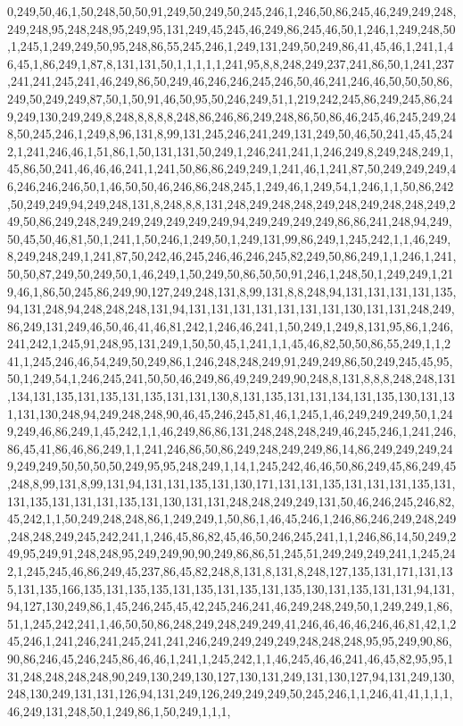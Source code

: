 0,249,50,46,1,50,248,50,50,91,249,50,249,50,245,246,1,246,50,86,245,46,249,249,248,249,248,95,248,248,95,249,95,131,249,45,245,46,249,86,245,46,50,1,246,1,249,248,50,1,245,1,249,249,50,95,248,86,55,245,246,1,249,131,249,50,249,86,41,45,46,1,241,1,46,45,1,86,249,1,87,8,131,131,50,1,1,1,1,1,241,95,8,8,248,249,237,241,86,50,1,241,237,241,241,245,241,46,249,86,50,249,46,246,246,245,246,50,46,241,246,46,50,50,50,86,249,50,249,249,87,50,1,50,91,46,50,95,50,246,249,51,1,219,242,245,86,249,245,86,249,249,130,249,249,8,248,8,8,8,8,248,86,246,86,249,248,86,50,86,46,245,46,245,249,248,50,245,246,1,249,8,96,131,8,99,131,245,246,241,249,131,249,50,46,50,241,45,45,242,1,241,246,46,1,51,86,1,50,131,131,50,249,1,246,241,241,1,246,249,8,249,248,249,1,45,86,50,241,46,46,46,241,1,241,50,86,86,249,249,1,241,46,1,241,87,50,249,249,249,46,246,246,246,50,1,46,50,50,46,246,86,248,245,1,249,46,1,249,54,1,246,1,1,50,86,242,50,249,249,94,249,248,131,8,248,8,8,131,248,249,248,248,249,248,249,248,248,249,249,50,86,249,248,249,249,249,249,249,249,94,249,249,249,249,86,86,241,248,94,249,50,45,50,46,81,50,1,241,1,50,246,1,249,50,1,249,131,99,86,249,1,245,242,1,1,46,249,8,249,248,249,1,241,87,50,242,46,245,246,46,246,245,82,249,50,86,249,1,1,246,1,241,50,50,87,249,50,249,50,1,46,249,1,50,249,50,86,50,50,91,246,1,248,50,1,249,249,1,219,46,1,86,50,245,86,249,90,127,249,248,131,8,99,131,8,8,248,94,131,131,131,131,135,94,131,248,94,248,248,248,131,94,131,131,131,131,131,131,131,130,131,131,248,249,86,249,131,249,46,50,46,41,46,81,242,1,246,46,241,1,50,249,1,249,8,131,95,86,1,246,241,242,1,245,91,248,95,131,249,1,50,50,45,1,241,1,1,45,46,82,50,50,86,55,249,1,1,241,1,245,246,46,54,249,50,249,86,1,246,248,248,249,91,249,249,86,50,249,245,45,95,50,1,249,54,1,246,245,241,50,50,46,249,86,49,249,249,90,248,8,131,8,8,8,248,248,131,134,131,135,131,135,131,135,131,131,130,8,131,135,131,131,134,131,135,130,131,131,131,130,248,94,249,248,248,90,46,45,246,245,81,46,1,245,1,46,249,249,249,50,1,249,249,46,86,249,1,45,242,1,1,46,249,86,86,131,248,248,248,249,46,245,246,1,241,246,86,45,41,86,46,86,249,1,1,241,246,86,50,86,249,248,249,249,86,14,86,249,249,249,249,249,249,50,50,50,50,249,95,95,248,249,1,14,1,245,242,46,46,50,86,249,45,86,249,45,248,8,99,131,8,99,131,94,131,131,135,131,130,171,131,131,135,131,131,131,135,131,131,135,131,131,131,135,131,130,131,131,248,248,249,249,131,50,46,246,245,246,82,45,242,1,1,50,249,248,248,86,1,249,249,1,50,86,1,46,45,246,1,246,86,246,249,248,249,248,248,249,245,242,241,1,246,45,86,82,45,46,50,246,245,241,1,1,246,86,14,50,249,249,95,249,91,248,248,95,249,249,90,90,249,86,86,51,245,51,249,249,249,241,1,245,242,1,245,245,46,86,249,45,237,86,45,82,248,8,131,8,131,8,248,127,135,131,171,131,135,131,135,166,135,131,135,135,131,135,131,135,131,135,130,131,135,131,131,94,131,94,127,130,249,86,1,45,246,245,45,42,245,246,241,46,249,248,249,50,1,249,249,1,86,51,1,245,242,241,1,46,50,50,86,248,249,248,249,249,41,246,46,46,46,246,46,81,42,1,245,246,1,241,246,241,245,241,241,246,249,249,249,249,248,248,248,95,95,249,90,86,90,86,246,45,246,245,86,46,46,1,241,1,245,242,1,1,46,245,46,46,241,46,45,82,95,95,131,248,248,248,248,90,249,130,249,130,127,130,131,249,131,130,127,94,131,249,130,248,130,249,131,131,126,94,131,249,126,249,249,249,50,245,246,1,1,246,41,41,1,1,1,46,249,131,248,50,1,249,86,1,50,249,1,1,1,